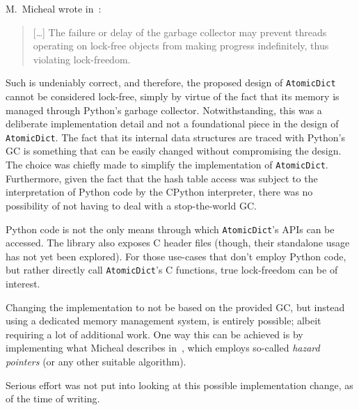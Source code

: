 M.\ Micheal wrote in~\cite[\S2.3]{micheal-hash-tables}:
\begin{quote}
[\ldots]
    The failure or delay of the garbage collector may prevent threads operating on lock-free objects from making progress indefinitely, thus violating lock-freedom.
\end{quote}

Such is undeniably correct, and therefore, the proposed design of \texttt{AtomicDict} cannot be considered lock-free, simply by virtue of the fact that its memory is managed through Python's garbage collector.
Notwithstanding, this was a deliberate implementation detail and not a foundational piece in the design of \texttt{AtomicDict}.
The fact that its internal data structures are traced with Python's GC is something that can be easily changed without compromising the design.
The choice was chiefly made to simplify the implementation of \texttt{AtomicDict}.
Furthermore, given the fact that the hash table access was subject to the interpretation of Python code by the CPython interpreter, there was no possibility of not having to deal with a stop-the-world GC\@.

Python code is not the only means through which \texttt{AtomicDict}'s APIs can be accessed.
The library also exposes C header files (though, their standalone usage has not yet been explored).
For those use-cases that don't employ Python code, but rather directly call \texttt{AtomicDict}'s C functions, true lock-freedom can be of interest.

Changing the implementation to not be based on the provided GC, but instead using a dedicated memory management system, is entirely possible; albeit requiring a lot of additional work.
One way this can be achieved is by implementing what Micheal describes in~\cite{micheal-safe-reclamation}, which employs so-called \emph{hazard pointers} (or any other suitable algorithm).

Serious effort was not put into looking at this possible implementation change, as of the time of writing.
